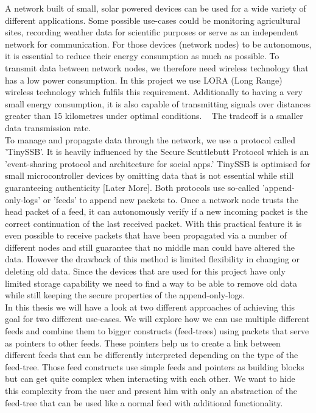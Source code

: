 A network built of small, solar powered devices can be used for a wide variety of different applications. Some possible use-cases could be monitoring agricultural sites, recording weather data for scientific purposes or serve as an independent network for communication. For those devices (network nodes) to be autonomous, it is essential to reduce their energy consumption as much as possible. To transmit data between network nodes, we therefore need wireless technology that has a low power consumption. In this project we use LORA (Long Range) wireless technology which fulfils this requirement. Additionally to having a very small energy consumption, it is also capable of transmitting signals over distances greater than 15 kilometres under optimal conditions. ~\cite{10.1007/978-3-030-01168-0_11} The tradeoff is a smaller data transmission rate. \\
To manage and propagate data through the network, we use a protocol called 'TinySSB'. It is heavily influenced by the Secure Scuttlebutt Protocol which is an 'event-sharing protocol and architecture for social apps.' \cite{10.1145/3357150.3357396} TinySSB is optimised for small microcontroller devices by omitting data that is not essential while still guaranteeing authenticity [Later More]. Both protocols use so-called 'append-only-logs' or 'feeds' to append new packets to. Once a network node trusts the head packet of a feed, it can autonomously verify if a new incoming packet is the correct continuation of the last received packet. With this practical feature it is even possible to receive packets that have been propagated via a number of different nodes and still guarantee that no middle man could have altered the data. However the drawback of this method is limited flexibility in changing or deleting old data. Since the devices that are used for this project have only limited storage capability we need to find a way to be able to remove old data while still keeping the secure properties of the append-only-logs. \\
In this thesis we will have a look at two different approaches of achieving this goal for two different use-cases. We will explore how we can use multiple different feeds and combine them to bigger constructs (feed-trees) using packets that serve as pointers to other feeds. These pointers help us to create a link between different feeds that can be differently interpreted depending on the type of the feed-tree. Those feed constructs use simple feeds and pointers as building blocks but can get quite complex when interacting with each other. We want to hide this complexity from the user and present him with only an abstraction of the feed-tree that can be used like a normal feed with additional functionality. \\

